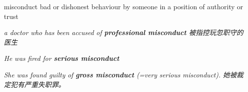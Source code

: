 \begin{DefWord}{misconduct}
    bad or dishonest behaviour by someone in a position of authority or trust

    \textit{a doctor who has been accused of \textbf{professional misconduct} 被指控玩忽职守的医生}

    \textit{He was fired for \textbf{serious misconduct}}

    \textit{She was found guilty of \textbf{gross misconduct} (=very serious misconduct). 她被裁定犯有严重失职罪。 }
\end{DefWord}